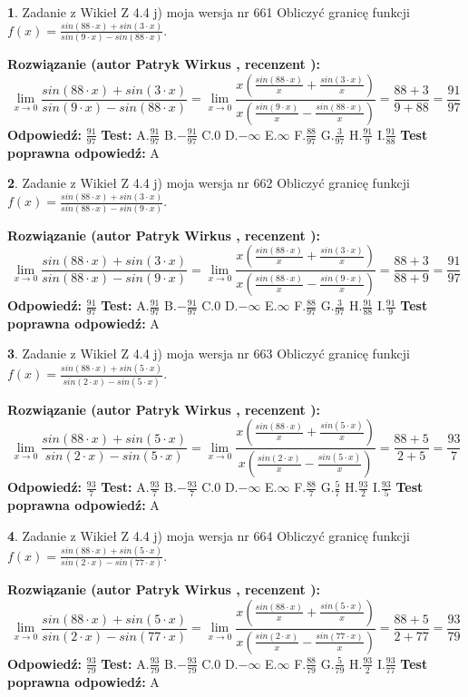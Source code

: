 \documentclass[12pt, a4paper]{article}
\theoremstyle{definition} %
\newtheorem{zad}{}
\newcommand{\zadStart}[1]{\begin{zad}#1\newline}
\newcommand{\zadStop}{\end{zad}}
\newcommand{\rozwStart}[2]{\noindent \textbf{Rozwiązanie (autor #1 , recenzent #2): }\newline}
\newcommand{\rozwStop}{\newline}
\newcommand{\odpStart}{\noindent \textbf{Odpowiedź:}\newline}
\newcommand{\odpStop}{\newline}
\newcommand{\testStart}{\noindent \textbf{Test:}\newline}
\newcommand{\testStop}{\newline}
\newcommand{\kluczStart}{\noindent \textbf{Test poprawna odpowiedź:}\newline}
\newcommand{\kluczStop}{\newline}
\begin{document}
\zadStart{Zadanie z Wikieł Z 4.4 j) moja wersja nr 661}
Obliczyć granicę funkcji $f(x)=\frac{sin(88\cdot x) +sin(3\cdot x)}{sin(9\cdot x) -sin(88\cdot x)}$.
\zadStop
\rozwStart{Patryk Wirkus}{}
$$\lim\limits_{x\to 0}\frac{sin(88\cdot x) +sin(3\cdot x)}{sin(9\cdot x) -sin(88\cdot x)}=\lim\limits_{x\to 0}\frac{x(\frac{sin(88\cdot x)}{x}+\frac{sin(3\cdot x)}{x})}{x(\frac{sin(9\cdot x)}{x}-\frac{sin(88\cdot x)}{x})}=\frac{88+3}{9+88} = \frac{91}{97}$$
\rozwStop
\odpStart
$\frac{91}{97}$
\odpStop
\testStart
A.$\frac{91}{97}$
B.$-\frac{91}{97}$
C.$0$
D.$-\infty$
E.$\infty$
F.$\frac{88}{97}$
G.$\frac{3}{97}$
H.$\frac{91}{9}$
I.$\frac{91}{88}$
\testStop
\kluczStart
A
\kluczStop



\zadStart{Zadanie z Wikieł Z 4.4 j) moja wersja nr 662}
Obliczyć granicę funkcji $f(x)=\frac{sin(88\cdot x) +sin(3\cdot x)}{sin(88\cdot x) -sin(9\cdot x)}$.
\zadStop
\rozwStart{Patryk Wirkus}{}
$$\lim\limits_{x\to 0}\frac{sin(88\cdot x) +sin(3\cdot x)}{sin(88\cdot x) -sin(9\cdot x)}=\lim\limits_{x\to 0}\frac{x(\frac{sin(88\cdot x)}{x}+\frac{sin(3\cdot x)}{x})}{x(\frac{sin(88\cdot x)}{x}-\frac{sin(9\cdot x)}{x})}=\frac{88+3}{88+9} = \frac{91}{97}$$
\rozwStop
\odpStart
$\frac{91}{97}$
\odpStop
\testStart
A.$\frac{91}{97}$
B.$-\frac{91}{97}$
C.$0$
D.$-\infty$
E.$\infty$
F.$\frac{88}{97}$
G.$\frac{3}{97}$
H.$\frac{91}{88}$
I.$\frac{91}{9}$
\testStop
\kluczStart
A
\kluczStop



\zadStart{Zadanie z Wikieł Z 4.4 j) moja wersja nr 663}
Obliczyć granicę funkcji $f(x)=\frac{sin(88\cdot x) +sin(5\cdot x)}{sin(2\cdot x) -sin(5\cdot x)}$.
\zadStop
\rozwStart{Patryk Wirkus}{}
$$\lim\limits_{x\to 0}\frac{sin(88\cdot x) +sin(5\cdot x)}{sin(2\cdot x) -sin(5\cdot x)}=\lim\limits_{x\to 0}\frac{x(\frac{sin(88\cdot x)}{x}+\frac{sin(5\cdot x)}{x})}{x(\frac{sin(2\cdot x)}{x}-\frac{sin(5\cdot x)}{x})}=\frac{88+5}{2+5} = \frac{93}{7}$$
\rozwStop
\odpStart
$\frac{93}{7}$
\odpStop
\testStart
A.$\frac{93}{7}$
B.$-\frac{93}{7}$
C.$0$
D.$-\infty$
E.$\infty$
F.$\frac{88}{7}$
G.$\frac{5}{7}$
H.$\frac{93}{2}$
I.$\frac{93}{5}$
\testStop
\kluczStart
A
\kluczStop



\zadStart{Zadanie z Wikieł Z 4.4 j) moja wersja nr 664}
Obliczyć granicę funkcji $f(x)=\frac{sin(88\cdot x) +sin(5\cdot x)}{sin(2\cdot x) -sin(77\cdot x)}$.
\zadStop
\rozwStart{Patryk Wirkus}{}
$$\lim\limits_{x\to 0}\frac{sin(88\cdot x) +sin(5\cdot x)}{sin(2\cdot x) -sin(77\cdot x)}=\lim\limits_{x\to 0}\frac{x(\frac{sin(88\cdot x)}{x}+\frac{sin(5\cdot x)}{x})}{x(\frac{sin(2\cdot x)}{x}-\frac{sin(77\cdot x)}{x})}=\frac{88+5}{2+77} = \frac{93}{79}$$
\rozwStop
\odpStart
$\frac{93}{79}$
\odpStop
\testStart
A.$\frac{93}{79}$
B.$-\frac{93}{79}$
C.$0$
D.$-\infty$
E.$\infty$
F.$\frac{88}{79}$
G.$\frac{5}{79}$
H.$\frac{93}{2}$
I.$\frac{93}{77}$
\testStop
\kluczStart
A
\kluczStop
\end{document}
